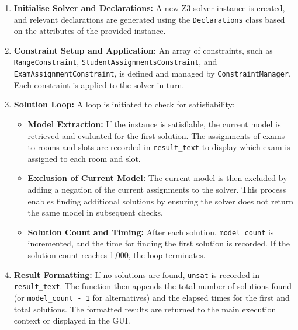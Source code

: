 \documentclass[a4paper]{article}
\begin{document}
    \sloppy
    \begin{enumerate}
        \item \textbf{Initialise Solver and Declarations:} A new Z3 solver instance is created, and relevant declarations are generated using the \texttt{Declarations} class based on the attributes of the provided instance.
        
        \item \textbf{Constraint Setup and Application:} An array of constraints, such as \texttt{Range\allowbreak Constraint}, \texttt{Student\allowbreak Assignments\allowbreak Constraint}, and \texttt{Exam\allowbreak Assignment\allowbreak Constraint}, is defined and managed by \texttt{Constraint\allowbreak Manager}. Each constraint is applied to the solver in turn.
    
        \item \textbf{Solution Loop:} A loop is initiated to check for satisfiability:
        \begin{itemize}
            \item \textbf{Model Extraction:} If the instance is satisfiable, the current model is retrieved and evaluated for the first solution. The assignments of exams to rooms and slots are recorded in \texttt{result\_text} to display which exam is assigned to each room and slot.
            
            \item \textbf{Exclusion of Current Model:} The current model is then excluded by adding a negation of the current assignments to the solver. This process enables finding additional solutions by ensuring the solver does not return the same model in subsequent checks.
            
            \item \textbf{Solution Count and Timing:} After each solution, \texttt{model\_count} is incremented, and the time for finding the first solution is recorded. If the solution count reaches 1,000, the loop terminates.
        \end{itemize}
    
        \item \textbf{Result Formatting:} If no solutions are found, \texttt{unsat} is recorded in \texttt{result\_text}. The function then appends the total number of solutions found (or \texttt{model\_count - 1} for alternatives) and the elapsed times for the first and total solutions. The formatted results are returned to the main execution context or displayed in the GUI.
    \end{enumerate}
    \fussy
    
\end{document}

